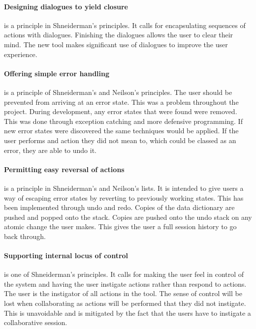 \paragraph*{Designing dialogues to yield closure} is a principle in Shneiderman's principles.  It calls for encapsulating sequences of actions with dialogues.  Finishing the dialogues allows the user to clear their mind.  The new tool makes significant use of dialogues to improve the user experience.

\paragraph*{Offering simple error handling} is a principle of Shneiderman's and Neilson's principles.  The user should be prevented from arriving at an error state.  This was a problem throughout the project.  During development, any error states that were found were removed. This was done through exception catching and more defensive programming.  If new error states were discovered the same techniques would be applied.  If the user performs and action they did not mean to, which could be classed as an error, they are able to undo it.

\paragraph*{Permitting easy reversal of actions} is a principle in Shneiderman's and Neilson's lists.  It is intended to give users a way of escaping error states by reverting to previously working states.  This has been implemented through undo and redo.  Copies of the data dictionary are pushed and popped onto the stack.  Copies are pushed onto the undo stack on any atomic change the user makes.  This gives the user a full session history to go back through.

\paragraph*{Supporting internal locus of control} is one of Shneiderman's principles.  It calls for making the user feel in control of the system and having the user instigate actions rather than respond to actions.  The user is the instigator of all actions in the tool.  The sense of control will be lost when collaborating as actions will be performed that they did not instigate.  This is unavoidable and is mitigated by the fact that the users have to instigate a collaborative session.

